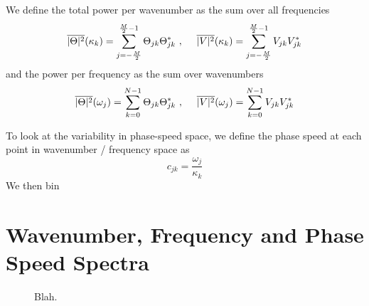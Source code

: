 \documentclass[10pt]{article}
\newcommand{\ol}{\ensuremath{\overline}}
\begin{document}
We define the total power per wavenumber as the sum over all frequencies
\begin{equation}
\ol{|\Theta|^2}(\kappa_k) = \sum_{j=-\frac{M}{2}}^{\frac{M}{2}-1} \Theta_{jk}  \Theta_{jk}^\ast \ , \ \ \ \ \ol{|V|^2}(\kappa_k) =  \sum_{j=-\frac{M}{2}}^{\frac{M}{2}-1} V_{jk}  V_{jk}^\ast
\end{equation}
and the power per frequency as the sum over wavenumbers
\begin{equation}
\ol{|\Theta|^2}(\omega_j) = \sum_{k=0}^{N-1} \Theta_{jk}  \Theta_{jk}^\ast  \ , \ \ \ \ \ol{|V|^2}(\omega_j) = \sum_{k=0}^{N-1} V_{jk}  V_{jk}^\ast
\end{equation}

To look at the variability in phase-speed space, we define the phase speed at each point in wavenumber / frequency space as
\begin{equation}
c_{jk} = \frac{\omega_j}{\kappa_k}
\end{equation}
We then bin



\section{Wavenumber, Frequency and Phase Speed Spectra}




\begin{figure*}[t!]
  \noindent %
  \caption{Blah.}
  \label{fig:a}
\end{figure*}

{}
{\clearpage}

{}
{\clearpage}


\end{document}
